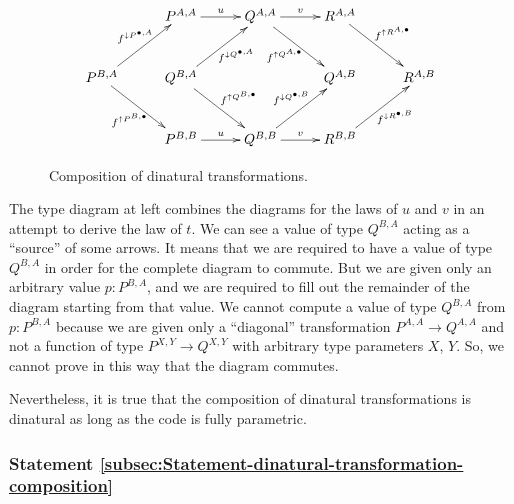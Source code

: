 \begin{wrapfigure}[11]{l}{0.55\columnwidth}%
\vspace{-1.6\baselineskip}
\[
\xymatrix{\xyScaleY{2.3pc}\xyScaleX{2.3pc} & P^{A,A}\ar[r]\sp(0.5){u} & Q^{A,A}\ar[r]\sp(0.5){v}\ar[rd]\sb(0.45){f^{\uparrow Q^{A,\bullet}}\negthickspace\negthickspace} & R^{A,A}\ar[rd]\sp(0.45){f^{\uparrow R^{A,\bullet}}}\\
P^{B,A}\ar[ru]\sp(0.5){f^{\downarrow P^{\bullet,A}}\negthickspace\negthickspace\negthickspace\negthickspace}\ar[rd]\sb(0.5){f^{\uparrow P^{B,\bullet}}\negthickspace\negthickspace} & Q^{B,A}\ar[ru]\sb(0.55){\negthickspace\negthickspace f^{\downarrow Q^{\bullet,A}}}\ar[rd]\sp(0.5){f^{\uparrow Q^{B,\bullet}}\negthickspace\negthickspace} &  & Q^{A,B} & R^{A,B}\\
 & P^{B,B}\ar[r]\sp(0.5){u} & Q^{B,B}\ar[r]\sp(0.5){v}\ar[ru]\sp(0.5){f^{\downarrow Q^{\bullet,B}}\negthickspace\negthickspace\negthickspace} & R^{B,B}\ar[ru]\sb(0.55){\negthickspace\negthickspace f^{\downarrow R^{\bullet,B}}}
}
\]

\vspace{-1.1\baselineskip}
\caption{Composition of dinatural transformations.\label{fig:Type-diagram-for-composition-of-dinatural-transformations}}
\end{wrapfigure}%
The type diagram at left combines the diagrams for the laws of $u$
and $v$ in an attempt to derive the law of $t$. We can see a value
of type $Q^{B,A}$ acting as a \textsf{``}source\textsf{''} of some arrows. It means
that we are required to have a value of type $Q^{B,A}$ in order for
the complete diagram to commute. But we are given only an arbitrary
value $p:P^{B,A}$, and we are required to fill out the remainder
of the diagram starting from that value. We cannot compute a value
of type $Q^{B,A}$ from $p:P^{B,A}$ because we are given only a \textsf{``}diagonal\textsf{''}
transformation $P^{A,A}\rightarrow Q^{A,A}$ and not a function of
type $P^{X,Y}\rightarrow Q^{X,Y}$ with arbitrary type parameters
$X$, $Y$. So, we cannot prove in this way that the diagram commutes. 

Nevertheless, it is true that the composition of dinatural transformations
is dinatural \textemdash{} as long as the code is fully parametric.

\subsubsection{Statement \label{subsec:Statement-dinatural-transformation-composition}\ref{subsec:Statement-dinatural-transformation-composition}}

